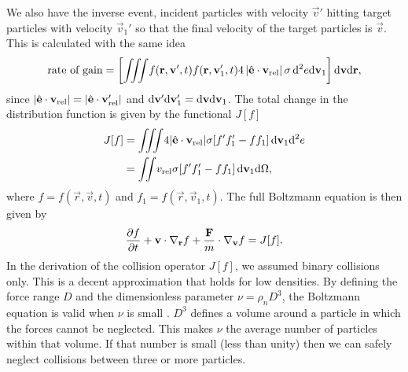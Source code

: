 We also have the inverse event, incident particles with velocity $\vec v'$ hitting target particles with velocity $\vec v_1'$ so that the final velocity of the target particles is $\vec v$. This is calculated with the same idea
\begin{align}
	\text{rate of gain} = \left[\iiint\! f(\mathbf r, \mathbf v', t)f(\mathbf r, \mathbf v_1', t)4\left|\hat {\mathbf{e}} \cdot \mathbf v_\text{rel} \right|\sigma \,\mathrm{d}^2 e\mathrm{d}\mathbf v_1\right]\mathrm{d}\mathbf v\mathrm{d}\mathbf r,
\end{align}
since $|\hat {\mathbf{e}}\cdot \mathbf v_\text{rel}| = |\hat {\mathbf{e}}\cdot \mathbf v_\text{rel}'|$ and $\mathrm{d}\mathbf v'\mathrm{d}\mathbf v_1' = \mathrm{d}\mathbf v\mathrm{d}\mathbf v_1$. The total change in the distribution function is given by the functional $J[f]$
\begin{align}
	J[f] &= \iiint\! 4|\hat {\mathbf{e}}\cdot\mathbf v_\text{rel}|\sigma[f'f_1' - ff_1]\,\mathrm{d}\mathbf v_1 \mathrm{d}^2e\\
	&= \iint\! v_\text{rel} \sigma[f'f_1' - ff_1] \,\mathrm{d}\mathbf v_1 \mathrm{d}\Omega,
\end{align}
where $f = f(\vec r, \vec v, t)$ and $f_1 = f(\vec r, \vec v_1, t)$. The full Boltzmann equation is then given by
\begin{align}
	\label{eq:boltzmann_equation}
	\frac{\partial f}{\partial t} + \mathbf v\cdot \nabla_\mathbf r f + \frac{\mathbf F}{m}\cdot\nabla_\mathbf v f = J[f].
\end{align}
In the derivation of the collision operator $J[f]$, we assumed binary collisions only. This is a decent approximation that holds for low densities. By defining the force range $D$ and the dimensionless parameter $\nu = \rho_n D^3$, the Boltzmann equation is valid when $\nu$ is small \cite{mclennan1989introduction}. $D^3$ defines a volume around a particle in which the forces cannot be neglected. This makes $\nu$ the average number of particles within that volume. If that number is small (less than unity) then we can safely neglect collisions between three or more particles.
